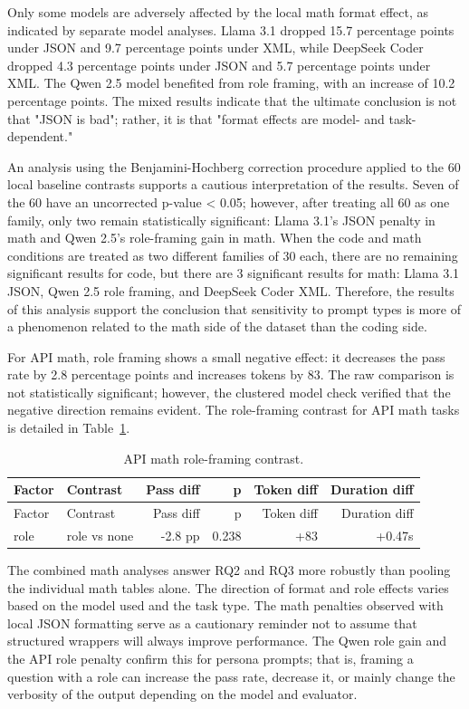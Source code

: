 Only some models are adversely affected by the local math format effect, as indicated by separate model analyses. Llama 3.1 dropped 15.7 percentage points under JSON and 9.7 percentage points under XML, while DeepSeek Coder dropped 4.3 percentage points under JSON and 5.7 percentage points under XML. The Qwen 2.5 model benefited from role framing, with an increase of 10.2 percentage points. The mixed results indicate that the ultimate conclusion is not that "JSON is bad"; rather, it is that "format effects are model- and task-dependent."

An analysis using the Benjamini-Hochberg correction procedure applied to the 60 local baseline contrasts supports a cautious interpretation of the results. Seven of the 60 have an uncorrected p-value \textless{} 0.05; however, after treating all 60 as one family, only two remain statistically significant: Llama 3.1's JSON penalty in math and Qwen 2.5's role-framing gain in math. When the code and math conditions are treated as two different families of 30 each, there are no remaining significant results for code, but there are 3 significant results for math: Llama 3.1 JSON, Qwen 2.5 role framing, and DeepSeek Coder XML. Therefore, the results of this analysis support the conclusion that sensitivity to prompt types is more of a phenomenon related to the math side of the dataset than the coding side.

For API math, role framing shows a small negative effect: it decreases the pass rate by 2.8 percentage points and increases tokens by 83. The raw comparison is not statistically significant; however, the clustered model check verified that the negative direction remains evident. The role-framing contrast for API math tasks is detailed in Table~\ref{tab:api-math-contrast}.

\begin{longtable}[]{@{}llrrrr@{}}
\caption{API math role-framing contrast.}\label{tab:api-math-contrast}\tabularnewline
\toprule\noalign{}
Factor & Contrast & Pass diff & p & Token diff & Duration diff \\
\midrule\noalign{}
\endfirsthead
\toprule\noalign{}
Factor & Contrast & Pass diff & p & Token diff & Duration diff \\
\midrule\noalign{}
\endhead
\bottomrule\noalign{}
\endlastfoot
role & role vs none & -2.8 pp & 0.238 & +83 & +0.47s \\
\end{longtable}

The combined math analyses answer RQ2 and RQ3 more robustly than pooling the individual math tables alone. The direction of format and role effects varies based on the model used and the task type. The math penalties observed with local JSON formatting serve as a cautionary reminder not to assume that structured wrappers will always improve performance. The Qwen role gain and the API role penalty confirm this for persona prompts; that is, framing a question with a role can increase the pass rate, decrease it, or mainly change the verbosity of the output depending on the model and evaluator.

